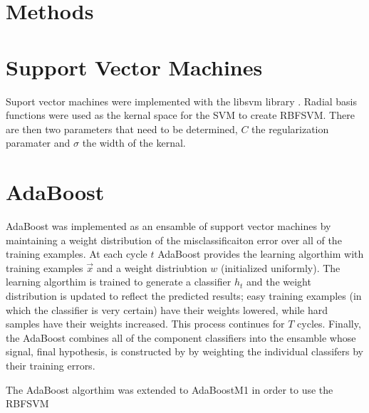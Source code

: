 \section{Methods}
\label{sec:Methods}

\section{Support Vector Machines}

Suport vector machines were implemented with the libsvm library \cite{LICITATION}.
Radial basis functions were used as the kernal space for the SVM to create RBFSVM.
There are then two parameters that need to be determined, $C$ the regularization paramater and $\sigma$ the width of the kernal.

\section{AdaBoost}

AdaBoost was implemented as an ensamble of support vector machines by maintaining a weight distribution of the misclassificaiton error over all of the training examples.
At each cycle $t$ AdaBoost provides the learning algorthim with training examples $\vec{x}$ and a weight distriubtion $w$ (initialized uniformly).
The learning algorthim is trained to generate a classifier $h_t$ and the weight distribution is updated to reflect the predicted results; easy training examples (in which the classifier is very certain) have their weights lowered, while hard samples have their weights increased.
This process continues for $T$ cycles.
Finally, the AdaBoost combines all of the component classifiers into the ensamble whose signal, final hypothesis, is constructed by by weighting the individual classifers by their training errors.

The AdaBoost algorthim was extended to AdaBoostM1 in order to use the RBFSVM
